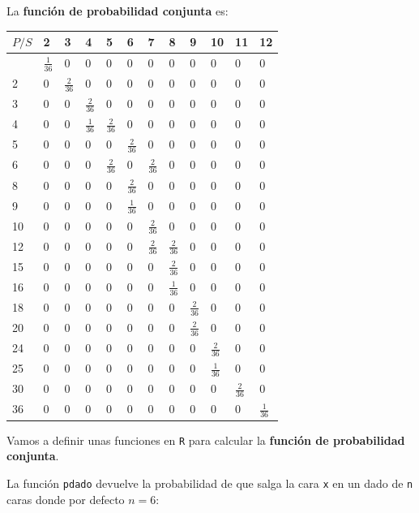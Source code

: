 \documentclass[
  letterpaper,
  DIV=11,
  numbers=noendperiod]{scrreprt}
\begin{document}
La \textbf{función de probabilidad conjunta} es:

\begin{longtable}[]{@{}llllllllllll@{}}
\toprule\noalign{}
\(P/S\) & 2 & 3 & 4 & 5 & 6 & 7 & 8 & 9 & 10 & 11 & 12 \\
\midrule\noalign{}
\endhead
\bottomrule\noalign{}
\endlastfoot
1 & \(\frac{1}{36}\) & 0 & 0 & 0 & 0 & 0 & 0 & 0 & 0 & 0 & 0 \\
2 & 0 & \(\frac{2}{36}\) & 0 & 0 & 0 & 0 & 0 & 0 & 0 & 0 & 0 \\
3 & 0 & 0 & \(\frac{2}{36}\) & 0 & 0 & 0 & 0 & 0 & 0 & 0 & 0 \\
4 & 0 & 0 & \(\frac{1}{36}\) & \(\frac{2}{36}\) & 0 & 0 & 0 & 0 & 0 & 0
& 0 \\
5 & 0 & 0 & 0 & 0 & \(\frac{2}{36}\) & 0 & 0 & 0 & 0 & 0 & 0 \\
6 & 0 & 0 & 0 & \(\frac{2}{36}\) & 0 & \(\frac{2}{36}\) & 0 & 0 & 0 & 0
& 0 \\
8 & 0 & 0 & 0 & 0 & \(\frac{2}{36}\) & 0 & 0 & 0 & 0 & 0 & 0 \\
9 & 0 & 0 & 0 & 0 & \(\frac{1}{36}\) & 0 & 0 & 0 & 0 & 0 & 0 \\
10 & 0 & 0 & 0 & 0 & 0 & \(\frac{2}{36}\) & 0 & 0 & 0 & 0 & 0 \\
12 & 0 & 0 & 0 & 0 & 0 & \(\frac{2}{36}\) & \(\frac{2}{36}\) & 0 & 0 & 0
& 0 \\
15 & 0 & 0 & 0 & 0 & 0 & 0 & \(\frac{2}{36}\) & 0 & 0 & 0 & 0 \\
16 & 0 & 0 & 0 & 0 & 0 & 0 & \(\frac{1}{36}\) & 0 & 0 & 0 & 0 \\
18 & 0 & 0 & 0 & 0 & 0 & 0 & 0 & \(\frac{2}{36}\) & 0 & 0 & 0 \\
20 & 0 & 0 & 0 & 0 & 0 & 0 & 0 & \(\frac{2}{36}\) & 0 & 0 & 0 \\
24 & 0 & 0 & 0 & 0 & 0 & 0 & 0 & 0 & \(\frac{2}{36}\) & 0 & 0 \\
25 & 0 & 0 & 0 & 0 & 0 & 0 & 0 & 0 & \(\frac{1}{36}\) & 0 & 0 \\
30 & 0 & 0 & 0 & 0 & 0 & 0 & 0 & 0 & 0 & \(\frac{2}{36}\) & 0 \\
36 & 0 & 0 & 0 & 0 & 0 & 0 & 0 & 0 & 0 & 0 & \(\frac{1}{36}\) \\
\end{longtable}

Vamos a definir unas funciones en \texttt{R} para calcular la
\textbf{función de probabilidad conjunta}.

La función \texttt{pdado} devuelve la probabilidad de que salga la cara
\texttt{x} en un dado de \texttt{n} caras donde por defecto \(n=6\):
\end{document}

